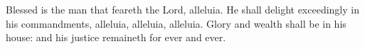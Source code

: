 Blessed is the man that feareth the Lord, alleluia.\versseparator
He shall delight exceedingly in his commandments, alleluia, alleluia, alleluia.
\versseparator
Glory and wealth shall be in his house: and his justice remaineth for ever and ever.
